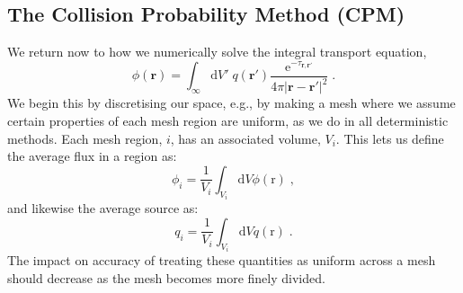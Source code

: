 \documentclass{article}
\begin{document}
\subsection{The Collision Probability Method (CPM)}
We return now to how we numerically solve the integral transport equation, 
\begin{equation*}
    \phi(\mathbf{r}) = \int_{\infty}\mathrm{d}V'\; q(\mathbf{r}')\frac{\mathrm{e}^{-\tau_{\mathbf{r},\mathbf{r}'}}}{4\pi |\mathbf{r}-\mathbf{r}'|^2}\;\mathrm{.}
\end{equation*}
We begin this by discretising our space, e.g., by  making a mesh where we assume certain properties of each mesh region are uniform, as we do in all deterministic methods. Each mesh region, $i$, has an associated volume, $V_i$. This lets us define the average flux in a region as:
\begin{equation}
    \phi_i = \frac{1}{V_i}\int_{V_i}\mathrm{d}V \phi(\mathrm{r})\;\mathrm{,}
\end{equation}
and likewise the average source as:
\begin{equation}
    q_i = \frac{1}{V_i}\int_{V_i}\mathrm{d}V q(\mathrm{r})\;\mathrm{.}
\end{equation}
The impact on accuracy of treating these quantities as uniform across a mesh should decrease as the mesh becomes more finely divided.
\end{document}
